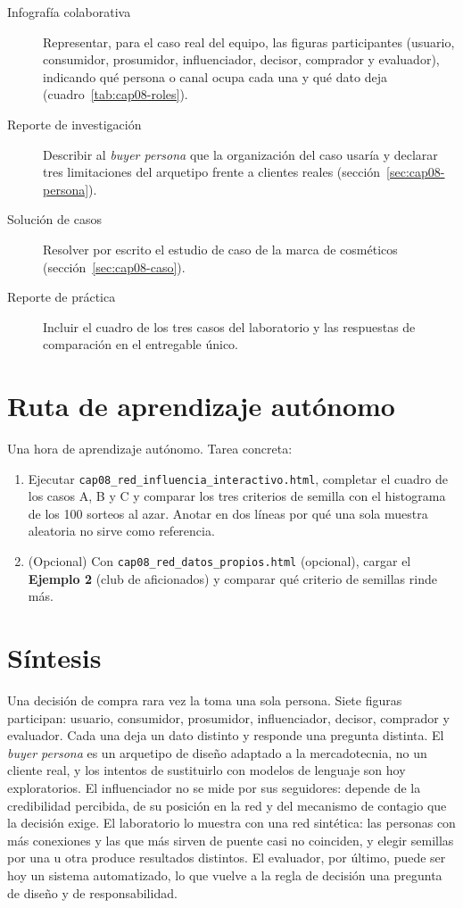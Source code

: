 \begin{description}
  \item[Infografía colaborativa] Representar, para el caso real del equipo, las
  figuras participantes (usuario, consumidor, prosumidor, influenciador,
  decisor, comprador y evaluador), indicando qué persona o canal ocupa cada
  una y qué dato deja (cuadro~\ref{tab:cap08-roles}).
  \item[Reporte de investigación] Describir al \textit{buyer persona} que la
  organización del caso usaría y declarar tres limitaciones del arquetipo
  frente a clientes reales (sección~\ref{sec:cap08-persona}).
  \item[Solución de casos] Resolver por escrito el estudio de caso de la marca
  de cosméticos (sección~\ref{sec:cap08-caso}).
  \item[Reporte de práctica] Incluir el cuadro de los tres casos del
  laboratorio y las respuestas de comparación en el entregable único.
\end{description}

\section{Ruta de aprendizaje autónomo}

Una hora de aprendizaje autónomo. Tarea concreta:
\begin{enumerate}
  \item Ejecutar \texttt{cap08\_red\_influencia\_interactivo.html}, completar el
  cuadro de los casos A, B y C y comparar los tres criterios de semilla con
  el histograma de los 100 sorteos al azar. Anotar en dos líneas por qué una
  sola muestra aleatoria no sirve como referencia.
  \item (Opcional) Con \texttt{cap08\_red\_datos\_propios.html} (opcional), cargar el \textbf{Ejemplo 2} (club de aficionados) y comparar qué criterio de semillas rinde más.
\end{enumerate}

\section{Síntesis}

Una decisión de compra rara vez la toma una sola persona. Siete figuras
participan: usuario, consumidor, prosumidor, influenciador, decisor, comprador
y evaluador. Cada una deja un dato distinto y responde una pregunta distinta.
El \textit{buyer persona} es un arquetipo de diseño adaptado a la
mercadotecnia, no un cliente real, y los intentos de sustituirlo con
modelos de lenguaje son hoy exploratorios. El influenciador no se mide por sus
seguidores: depende de la credibilidad percibida, de su posición en la red
y del mecanismo de contagio que la decisión exige. El laboratorio lo
muestra con una red sintética: las personas con más conexiones y las que más
sirven de puente casi no coinciden, y elegir semillas por una u otra produce
resultados distintos. El evaluador, por último, puede ser hoy un sistema
automatizado, lo que vuelve a la regla de decisión una pregunta de diseño
y de responsabilidad.

